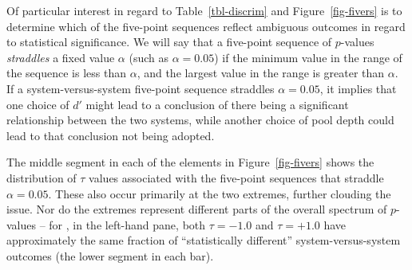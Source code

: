 Of particular interest in regard to Table~\ref{tbl-discrim} and
Figure~\ref{fig-fivers} is to determine which of the five-point
sequences reflect ambiguous outcomes in regard to statistical
significance.
We will say that a five-point sequence of $p$-values
{\emph{straddles}} a fixed value $\alpha$ (such as $\alpha=0.05$) if
the minimum value in the range of the sequence is less than $\alpha$,
and the largest value in the range is greater than $\alpha$.
If a system-versus-system five-point sequence straddles
$\alpha=0.05$, it implies that one choice of $d'$ might lead to a
conclusion of there being a significant relationship between the two
systems, while another choice of pool depth could lead to that
conclusion not being adopted.

The middle segment in each of the elements in Figure~\ref{fig-fivers}
shows the distribution of $\tau$ values associated with the
five-point sequences that straddle $\alpha=0.05$.
These also occur primarily at the two extremes, further clouding the
issue.
Nor do the extremes represent different parts of the overall spectrum
of $p$-values -- for {\ap}, in the left-hand pane, both $\tau=-1.0$
and $\tau=+1.0$ have approximately the same fraction of
``statistically different'' system-versus-system outcomes (the lower
segment in each bar).

